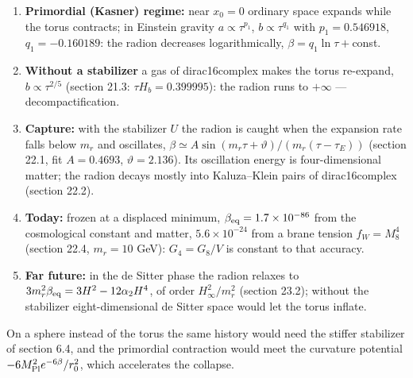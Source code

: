 \documentclass[10pt,a4paper]{article}
\begin{document}
\begin{enumerate}
\item \textbf{Primordial (Kasner) regime:} near $x_0=0$ ordinary space expands while the torus contracts; in Einstein gravity $a\propto\tau^{p_1}$, $b\propto\tau^{q_1}$ with $p_1=0.546918$, $q_1=-0.160189$: the radion decreases logarithmically, $\beta=q_1\ln\tau+$const.
\item \textbf{Without a stabilizer} a gas of dirac16complex makes the torus re-expand, $b\propto\tau^{2/5}$ (section 21.3: $\tau H_b=0.399995$): the radion runs to $+\infty$ — decompactification.
\item \textbf{Capture:} with the stabilizer $U$ the radion is caught when the expansion rate falls below $m_r$ and oscillates, $\beta\simeq A\sin(m_r\tau+\vartheta)/(m_r(\tau-\tau_E))$ (section 22.1, fit $A=0.4693$, $\vartheta=2.136$). Its oscillation energy is four-dimensional matter; the radion decays mostly into Kaluza–Klein pairs of dirac16complex (section 22.2).
\item \textbf{Today:} frozen at a displaced minimum, $\beta_{\rm eq}=1.7\times10^{-86}$ from the cosmological constant and matter, $5.6\times10^{-24}$ from a brane tension $f_W=M_8^4$ (section 22.4, $m_r=10$ GeV): $G_4=G_8/V$ is constant to that accuracy.
\item \textbf{Far future:} in the de Sitter phase the radion relaxes to $3m_r^2\beta_{\rm eq}=3H^2-12\alpha_2H^4$, of order $H_\infty^2/m_r^2$ (section 23.2); without the stabilizer eight-dimensional de Sitter space would let the torus inflate.
\end{enumerate}
On a sphere instead of the torus the same history would need the stiffer stabilizer of section 6.4, and the primordial contraction would meet the curvature potential $-6M_{\rm Pl}^2e^{-6\beta}/r_0^2$, which accelerates the collapse.
\end{document}
